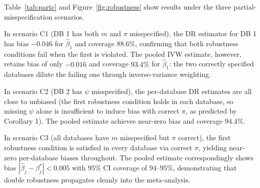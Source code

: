 Table~\ref{tab:partc} and Figure~\ref{fig:robustness} show results under
the three partial-misspecification scenarios.

In scenario C1 (DB 1 has both $m$ and $\pi$ misspecified), the DR
estimator for DB 1 has bias $-0.046$ for $\hat\beta_1$
and coverage $88.6\%$, confirming that both robustness conditions fail
when the first is violated.
The pooled IVW estimate, however, retains bias of only $-0.016$ and
coverage $93.4\%$ for $\hat\beta_1$: the two correctly specified databases
dilute the failing one through inverse-variance weighting.

In scenario C2 (DB 2 has $\psi$ misspecified), the per-database DR
estimates are all close to unbiased (the first robustness condition holds in
each database, so missing $\psi$ alone is insufficient to induce bias with
correct $\pi$, as predicted by Corollary 1).
The pooled estimate achieves near-zero bias and coverage $94.4\%$.

In scenario C3 (all databases have $m$ misspecified but $\pi$ correct),
the first robustness condition is satisfied in every database via correct
$\pi$, yielding near-zero per-database biases throughout.
The pooled estimate correspondingly shows bias $|\hat\beta_j - \beta_j^*|
< 0.005$ with $95\%$ CI coverage of $94$--$95\%$,
demonstrating that double robustness propagates cleanly into the
meta-analysis.

